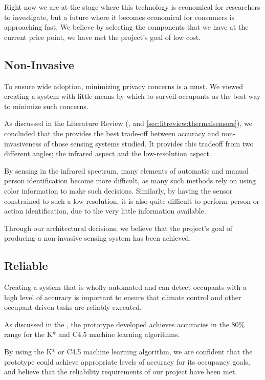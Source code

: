 \documentclass[../thesis/thesis.tex]{subfiles}
\begin{document}
Right now we are at the stage where this technology is economical for researchers to investigate, but a future where it becomes economical for consumers is approaching fast. We believe by selecting the components that we have at the current price point, we have met the project's goal of low cost.

\subsection{Non-Invasive}
To ensure wide adoption, minimizing privacy concerns is a must. We viewed creating a system with little means by which to  surveil occupants as the best way to minimize such concerns.

As discussed in the Literature Review (,  and \ref{sec:litreview:thermalsensors}), we concluded that the \mlx provides the best trade-off between accuracy and non-invasiveness of those sensing systems studied. It provides this tradeoff from two different angles; the infrared aspect and the low-resolution aspect. 

By sensing in the infrared spectrum, many elements of automatic and manual person identification become more difficult, as many such methods rely on using color information to make such decisions. Similarly, by having the sensor constrained to such a low resolution, it is also quite difficult to perform person or action identification, due to the very little information available.

Through our architectural decisions, we believe that the project's goal of producing a non-invasive sensing system has been achieved.

\subsection{Reliable}
Creating a system that is wholly automated and can detect occupants with a high level of accuracy is important to ensure that climate control and other occupant-driven tasks are reliably executed.

As discussed in the , the prototype developed achieves accuracies in the 80\% range for the K* and C4.5 machine learning algorithms.

By using the K* or C4.5 machine learning algorithm, we are confident that the prototype could achieve appropriate levels of accuracy for its occupancy goals, and believe that the reliability requirements of our project have been met.
\end{document}
